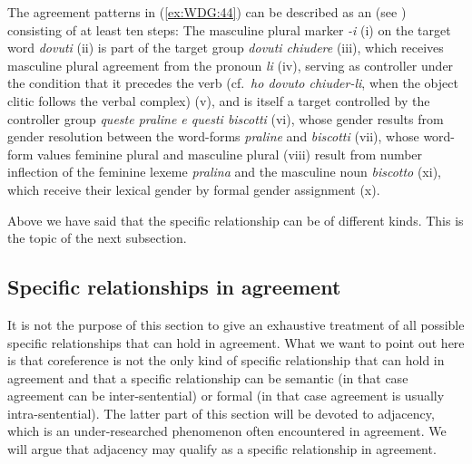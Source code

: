 \documentclass[output=collectionpaper]{langsci/langscibook}
\begin{document}
%

The agreement patterns in (\ref{ex:WDG:44}) can be described as an  (see \citealt{Waelchli2018}) consisting of at least ten steps: The masculine plural marker \textit{-i} (i) on the target word \textit{dovuti} (ii) is part of the target group \textit{dovuti chiudere} (iii), which receives masculine plural agreement from the pronoun \textit{li} (iv), serving as controller under the condition that it precedes the verb (cf.\ \textit{ho dovuto chiuder-li}, when the object clitic follows the verbal complex) (v), and is itself a target controlled by the controller group \textit{queste praline e questi biscotti} (vi), whose gender results from gender resolution between the word-forms \textit{praline} and \textit{biscotti} (vii), whose word-form values feminine plural and masculine plural (viii) result from number inflection of the feminine lexeme \textit{pralina} and the masculine noun \textit{biscotto} (xi), which receive their lexical gender by formal gender assignment (x).

Above we have said that the specific relationship can be of different kinds. This is the topic of the next subsection.

  \subsection{Specific relationships in agreement}
\label{sec:WDG:7.2}

It is not the purpose of this section to give an exhaustive treatment of all possible specific relationships that can hold in agreement. What we want to point out here is that coreference is not the only kind of specific relationship that can hold in agreement and that a specific relationship can be semantic (in that case agreement can be inter-sentential) or formal (in that case agreement is usually intra-sentential). The latter part of this section will be devoted to adjacency, which is an under-researched phenomenon often encountered in agreement. We will argue that adjacency may qualify as a specific relationship in agreement.
\end{document}
